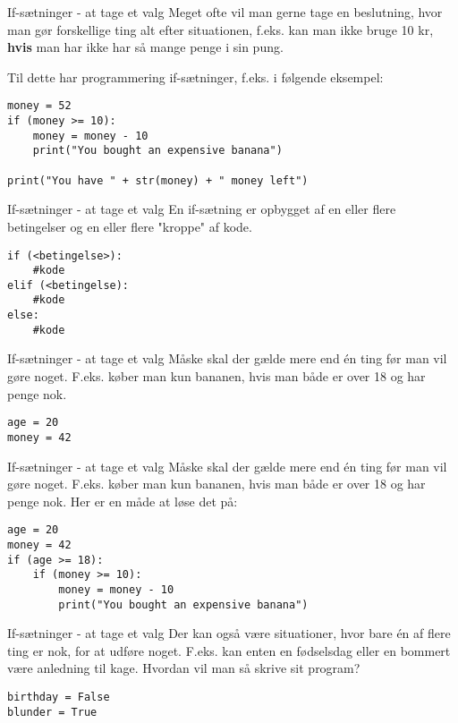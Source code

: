 \documentclass[main.tex]{subfiles}
\begin{document}
\begin{frame}[fragile]{If-sætninger - at tage et valg}
	Meget ofte vil man gerne tage en beslutning, hvor man gør forskellige ting alt efter situationen, f.eks. kan man ikke bruge 10 kr, \textbf{hvis} man har ikke har så mange penge i sin pung.
	
	Til dette har programmering if-sætninger, f.eks. i følgende eksempel:
	\begin{lstlisting}[style=python]
money = 52
if (money >= 10):
    money = money - 10
    print("You bought an expensive banana")
		
print("You have " + str(money) + " money left")
	\end{lstlisting}
\end{frame}

\begin{frame}[fragile]{If-sætninger - at tage et valg}
	En if-sætning er opbygget af en eller flere betingelser og en eller flere "kroppe" af kode.
	
	\begin{lstlisting}[style=python]
if (<betingelse>):
	#kode
elif (<betingelse):
	#kode
else:
	#kode
	\end{lstlisting}
\end{frame}

\begin{frame}[fragile]{If-sætninger - at tage et valg}
	Måske skal der gælde mere end én ting før man vil gøre noget. F.eks. køber man kun bananen, hvis man både er over 18 og har penge nok. 
	\begin{lstlisting}[style=python]
age = 20
money = 42
	\end{lstlisting}
\end{frame}

\begin{frame}[fragile]{If-sætninger - at tage et valg}
	Måske skal der gælde mere end én ting før man vil gøre noget. F.eks. køber man kun bananen, hvis man både er over 18 og har penge nok. Her er en måde at løse det på:
	\begin{lstlisting}[style=python]
age = 20
money = 42
if (age >= 18):
	if (money >= 10):
		money = money - 10
		print("You bought an expensive banana")
	\end{lstlisting}
\end{frame}

\begin{frame}[fragile]{If-sætninger - at tage et valg}
	Der kan også være situationer, hvor bare én af flere ting er nok, for at udføre noget. F.eks. kan enten en fødselsdag eller en bommert være anledning til kage. Hvordan vil man så skrive sit program?
	\begin{lstlisting}[style=python]
birthday = False
blunder = True
	\end{lstlisting}
\end{frame}
\end{document}
